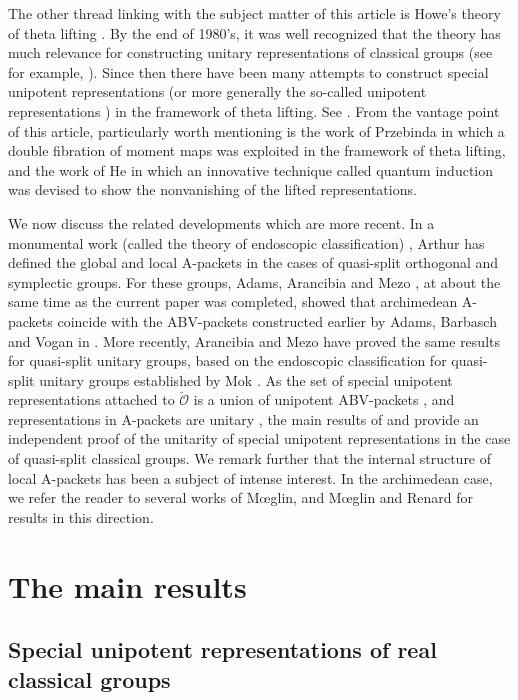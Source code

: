\documentclass[11pt,a4paper]{amsart}
\newcommand{\CO}{{\mathcal {O}}}
\numberwithin{equation}{section}
\theoremstyle{remark}
\begin{document}
The other thread linking with the subject matter of this article is  Howe's theory of theta lifting \cite{Howe79,Howe89}. By the
end of 1980's, it was well recognized that the theory has much relevance for constructing unitary representations of
classical groups (see for example, \cite{HoweRank,Li89}). Since then there have been many attempts to construct special unipotent representations (or more generally the so-called unipotent representations \cite{VoBook})
in the framework of theta lifting. See \cites{Sa,HZ,HL,Br,He,Tr,PT,LM,B17, Mo17}.
From the vantage point of this article, particularly worth mentioning is the work of Przebinda \cites{Pz1,Pz2} in which a double
fibration of moment maps was exploited in the framework of theta lifting, and the work of He \cite{He} in which an innovative technique called quantum
induction was devised to show the nonvanishing of the lifted representations.

We now discuss the related developments which are more recent. In a monumental work (called the theory of endoscopic classification) \cite{ArEnd}, Arthur has defined the global and local A-packets in the cases of quasi-split orthogonal and symplectic groups.  For these groups, Adams, Arancibia and Mezo \cite{AAM}, at about the same time as the current paper was completed, showed that archimedean A-packets coincide with the ABV-packets constructed earlier by Adams, Barbasch and Vogan in \cite{ABV}. More recently, Arancibia and Mezo \cite{AM} have proved the same results for quasi-split unitary groups, based on the endoscopic classification for quasi-split unitary groups established by Mok \cite{Mok}. As the set of special unipotent representations attached to $\check \CO$ is a union of unipotent ABV-packets \cite[Corollary 27.13]{ABV}, and representations in A-packets are %
unitary \cite{ArEnd,Mok}, the main results of \cite{AAM} and \cite{AM} provide an independent proof of the unitarity of special unipotent representations in the case of  quasi-split classical groups. We remark further that the internal structure of local A-packets has been a subject of intense interest.
In the archimedean case, we refer the reader to several works of M{\oe}glin, and M{\oe}glin and Renard \cite{Mo17,MR18a,MR18b,MR19,MR20} for results in this direction.


\section{The main results}
\subsection{Special unipotent representations of real classical groups}\label{secsu}
\end{document}
